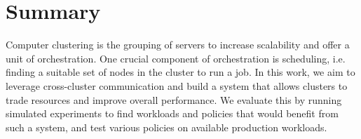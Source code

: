 \section{Summary}
Computer clustering is the grouping of servers to increase scalability and offer a unit of orchestration. 
One crucial component of orchestration is scheduling, i.e. finding a suitable set of nodes in the cluster 
to run a job. In this work, we aim to leverage cross-cluster communication and build a system that allows 
clusters to trade resources and improve overall performance. 
We evaluate this by running simulated experiments to find workloads and policies that 
would benefit from such a system, and test various policies on available production workloads.